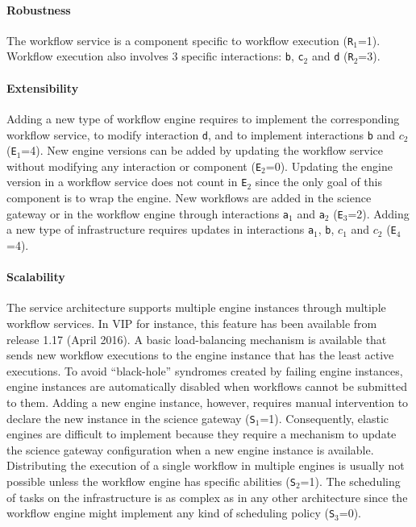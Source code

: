 \documentclass[preprint,3p,twocolumn]{elsarticle}
\begin{document}
\paragraph{Robustness} The workflow service is a component specific to
workflow execution (\texttt{R$_1$}=1). Workflow execution also
involves 3 specific interactions: \texttt{b},
\texttt{c$_2$} and \texttt{d} (\texttt{R$_2$}=3).

\paragraph{Extensibility} Adding a new type of workflow engine
requires to implement the corresponding workflow service, to modify
interaction \texttt{d}, and to implement interactions \texttt{b} and
\texttt{$c_2$} (\texttt{E$_1$}=4). New engine versions can be added by
updating the workflow service without modifying any interaction or
component (\texttt{E$_2$}=0). Updating the engine version in a
workflow service does not count in \texttt{E$_2$} since the only goal of this component
is to wrap the engine.  New workflows are added in the science gateway
or in the workflow engine through interactions \texttt{a$_1$} and
\texttt{a$_2$} (\texttt{E$_3$}=2). Adding a new type of infrastructure
requires updates in interactions \texttt{a$_1$}, \texttt{b},
\texttt{$c_1$} and \texttt{$c_2$} (\texttt{E$_4$}=4).

\paragraph{Scalability} The service architecture supports multiple
engine instances through multiple workflow services. In VIP for
instance, this feature has been available from release 1.17 (April
2016). A basic load-balancing mechanism is available that sends new
workflow executions to the engine instance that has the least active
executions. To avoid ``black-hole'' syndromes created by failing
engine instances, engine instances are automatically disabled when
workflows cannot be submitted to them. Adding a new engine instance,
however, requires manual intervention to declare the new instance in
the science gateway (\texttt{S$_1$}=1). Consequently, elastic engines
are difficult to implement because they require a mechanism to update
the science gateway configuration when a new engine instance is
available. Distributing the execution of a single
workflow in multiple engines is usually not possible unless the
workflow engine has specific abilities (\texttt{S$_2$}=1). The
scheduling of tasks on the infrastructure is as complex as in any
other architecture since the workflow engine might implement any kind
of scheduling policy (\texttt{S$_3$}=0).
\end{document}
